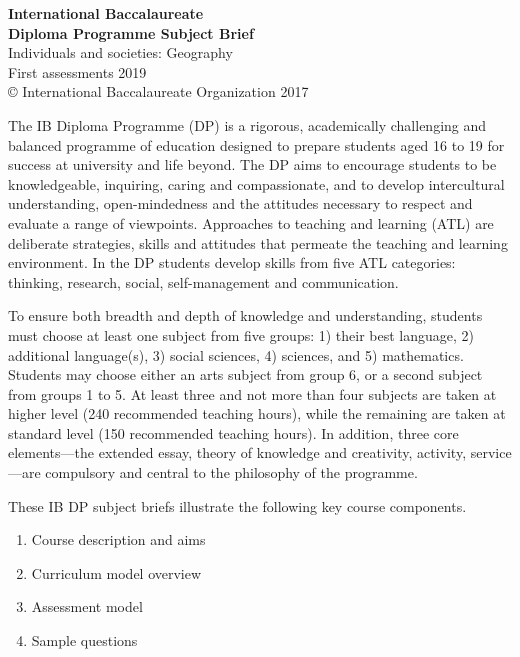 \documentclass[11pt,a4paper]{article}
\begin{document}
\begin{center}
{\Large\textbf{International Baccalaureate}}\\[2pt]
{\Large\textbf{Diploma Programme Subject Brief}}\\[6pt]
{\large Individuals and societies: Geography}\\[4pt]
First assessments 2019\\[6pt]
\copyright{} International Baccalaureate Organization 2017
\end{center}

The IB Diploma Programme (DP) is a rigorous, academically challenging and balanced
programme of education designed to prepare students aged 16 to 19 for success at
university and life beyond. The DP aims to encourage students to be knowledgeable,
inquiring, caring and compassionate, and to develop intercultural understanding,
open-mindedness and the attitudes necessary to respect and evaluate a range of
viewpoints. Approaches to teaching and learning (ATL) are deliberate strategies,
skills and attitudes that permeate the teaching and learning environment. In the
DP students develop skills from five ATL categories: thinking, research, social,
self-management and communication.

To ensure both breadth and depth of knowledge and understanding, students must
choose at least one subject from five groups: 1) their best language, 2) additional
language(s), 3) social sciences, 4) sciences, and 5) mathematics. Students may choose
either an arts subject from group 6, or a second subject from groups 1 to 5. At least
three and not more than four subjects are taken at higher level (240 recommended
teaching hours), while the remaining are taken at standard level (150 recommended
teaching hours). In addition, three core elements---the extended essay, theory of
knowledge and creativity, activity, service---are compulsory and central to the
philosophy of the programme.

These IB DP subject briefs illustrate the following key course components.
\begin{enumerate}[label=\Roman*.]
    \item Course description and aims
    \item Curriculum model overview
    \item Assessment model
    \item Sample questions
\end{enumerate}
\end{document}
